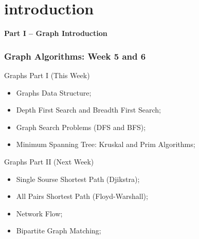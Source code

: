 \section{introduction}

\begin{frame}
  \begin{center}
    {\bf Part I -- Graph Introduction}
  \end{center}
\end{frame}

\begin{frame}
  \frametitle{Graph Algorithms: Week 5 and 6}
  \begin{block}{Graphs Part I (This Week)}
    \begin{itemize}
    \item Graphs Data Structure;
    \item Depth First Search and Breadth First Search;
    \item Graph Search Problems (DFS and BFS);
    \item Minimum Spanning Tree: Kruskal and Prim Algorithms;
    \end{itemize}
  \end{block}
  \begin{block}{Graphs Part II (Next Week)}
    \begin{itemize}
    \item Single Sourse Shortest Path (Djikstra);
    \item All Pairs Shortest Path (Floyd-Warshall);
    \item Network Flow;
    \item Bipartite Graph Matching;
    \end{itemize}
  \end{block}
\end{frame}


